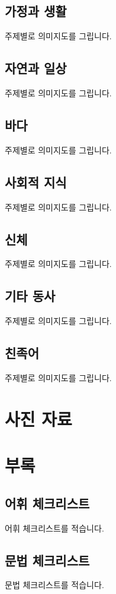\documentclass{snu-fl-questionnaire}
\begin{document}
\section{가정과 생활}
주제별로 의미지도를 그립니다.

\section{자연과 일상}
주제별로 의미지도를 그립니다.

\section{바다}
주제별로 의미지도를 그립니다.

\section{사회적 지식}
주제별로 의미지도를 그립니다.

\section{신체}
주제별로 의미지도를 그립니다.

\section{기타 동사}
주제별로 의미지도를 그립니다.

\section{친족어}
주제별로 의미지도를 그립니다.

\chapter{사진 자료}
\ImageRefs

\chapter*{부록}
\begin{appendices}

\section{어휘 체크리스트}
어휘 체크리스트를 적습니다.

\section{문법 체크리스트}
문법 체크리스트를 적습니다.

\end{appendices}


\backmatter
\makebackcover
\end{document}
